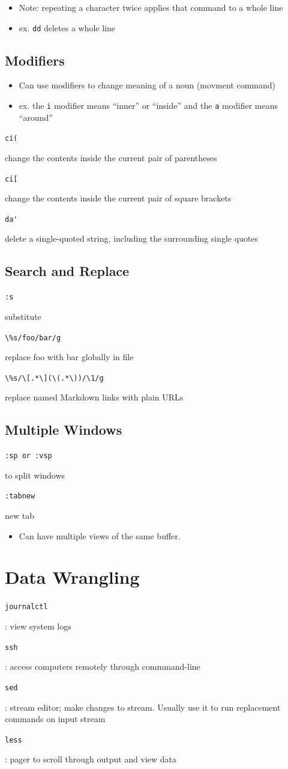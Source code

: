 \documentclass[letterpaper,12pt]{article}
\newcommand*{\lstitem}[1]{
  \setbox0\hbox{\lstinline{#1}}
  \item[\usebox0]
}
\begin{document}
\begin{itemize}
 \item Note: repeating a character twice applies that command to a whole line
 \item ex. \lstinline{dd} deletes a whole line
\end{itemize}

\subsection{Modifiers}
\begin{itemize}
 \item Can use modifiers to change meaning of a noun (movment command)
 \item ex. the \lstinline{i} modifier means ``inner'' or ``inside'' and the \lstinline{a} modifier means ``around''
\end{itemize}

\begin{description}
 \lstitem{ci(} change the contents inside the current pair of parentheses
 \lstitem{ci[} change the contents inside the current pair of square brackets
 \lstitem{da'} delete a single-quoted string, including the surrounding single quotes
\end{description}

\subsection{Search and Replace}
\begin{description}
 \lstitem{:s} substitute
 \lstitem{\%s/foo/bar/g} replace foo with bar globally in file
 \lstitem{\%s/\[.*\](\(.*\))/\1/g} replace named Markdown links with plain URLs
\end{description}

\subsection{Multiple Windows}
\begin{description}
 \lstitem{:sp or :vsp} to split windows
 \lstitem{:tabnew} new tab
\end{description}

\begin{itemize}
 \item Can have multiple views of the same buffer.
\end{itemize}

\section{Data Wrangling}
\begin{description}
 \lstitem{journalctl}: view system logs
 \lstitem{ssh}: access computers remotely through commmand-line
 \lstitem{sed}: stream editor; make changes to stream. Usually use it to run  replacement commands on input stream
 \lstitem{less}: pager to scroll through output and view data
\end{description}
\end{document}
